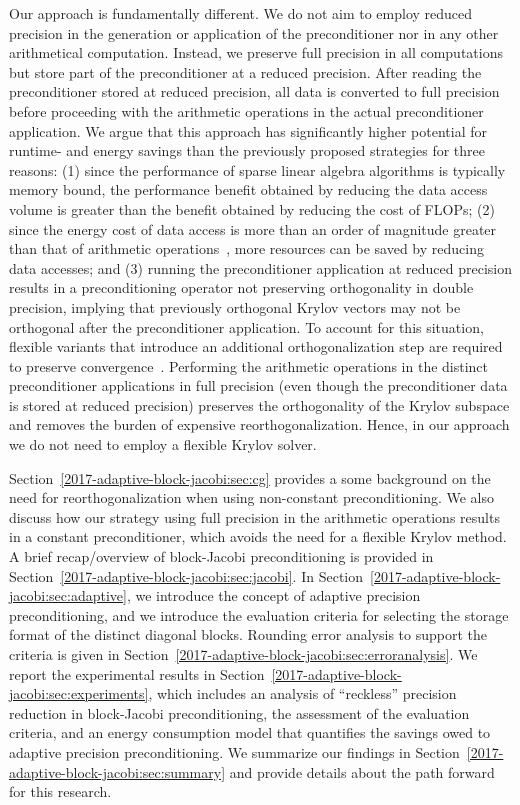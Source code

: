 Our approach is fundamentally different. We do not aim to
employ reduced precision in the generation or application of the
preconditioner nor in any other arithmetical computation. Instead, we preserve
full precision in all computations but store part of the preconditioner at a
reduced precision. After reading the preconditioner stored at reduced precision,
all data is converted to full precision before proceeding with the arithmetic
operations in the actual preconditioner application. We argue that this 
approach has
significantly higher potential for runtime- and energy savings 
than the previously proposed strategies for three reasons: 
(1) since the performance of sparse linear algebra algorithms
is typically memory bound, the performance benefit obtained by reducing the 
data 
access volume is greater than the benefit obtained by reducing the cost of 
FLOPs; 
(2) since the energy cost of data access is more than an order of magnitude 
greater than that of
arithmetic operations~\cite{shalf}, more resources can be saved by
reducing data accesses; 
and (3) running the preconditioner application at reduced precision results
in a preconditioning operator not preserving orthogonality in double precision, 
implying that previously orthogonal
Krylov vectors may not be orthogonal after the preconditioner application. To 
account for this
situation, flexible variants that introduce an additional orthogonalization step
are required to preserve convergence~\cite{doi:10.1137/S1064827597323415}.
Performing the arithmetic operations in the distinct preconditioner 
applications in
full precision (even though the preconditioner data is stored at reduced
precision) preserves the orthogonality of the Krylov subspace and 
removes the burden of expensive reorthogonalization.
Hence, in our approach we do not need to employ a flexible Krylov solver.

Section~\ref{2017-adaptive-block-jacobi:sec:cg} provides a some background on the need for 
reorthogonalization when using non-constant preconditioning.
We also discuss how our strategy using full precision in the arithmetic 
operations results in a constant preconditioner, 
which avoids the need for a flexible Krylov method.
A brief recap/overview of block-Jacobi preconditioning is
provided in Section~\ref{2017-adaptive-block-jacobi:sec:jacobi}. In Section~\ref{2017-adaptive-block-jacobi:sec:adaptive}, we
introduce the concept of adaptive precision preconditioning, and we introduce 
the evaluation
criteria for selecting the storage format of the distinct diagonal blocks. 
Rounding error analysis to support the criteria is given in 
Section~\ref{2017-adaptive-block-jacobi:sec:erroranalysis}.
We report the experimental results in Section~\ref{2017-adaptive-block-jacobi:sec:experiments}, which 
includes
an analysis of ``reckless'' precision reduction in block-Jacobi preconditioning,
the assessment of the evaluation criteria, and an energy consumption model that
quantifies the savings owed to adaptive precision preconditioning. We summarize
our findings in Section~\ref{2017-adaptive-block-jacobi:sec:summary} and provide details about the path
forward for this research.

